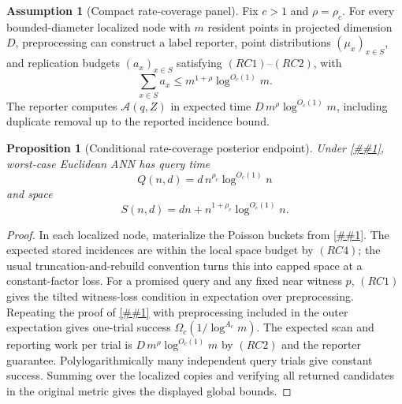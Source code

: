 \documentclass[10pt]{article}
\newcommand{\cref}[1]{\ref{##1}}
\newtheorem{proposition}[theorem]{Proposition}
\theoremstyle{definition}
\newtheorem{assumption}[theorem]{Assumption}
\begin{document}
\begin{assumption}[Compact rate-coverage panel]
   \label{asm:rate-coverage-panel}
   Fix \(c>1\) and \(\rho=\rho_c\).  For every bounded-diameter localized node
   with \(m\) resident points in projected dimension \(D\), preprocessing can
   construct a label reporter, point distributions \((\mu_x)_{x\in S}\), and
   replication budgets \((a_x)_{x\in S}\) satisfying \((RC1)\)--\((RC2)\), with
   \[
      \sum_{x\in S}a_x
      \le
      m^{1+\rho}\log^{O_c(1)}m .
      \tag{RC4}
   \]
   The reporter computes \(\mathcal A(q,Z)\) in expected time
   \(D\,m^\rho\log^{O_c(1)}m\), including duplicate removal up to the reported
   incidence bound.
\end{assumption}

\begin{proposition}[Conditional rate-coverage posterior endpoint]
   \label{prop:rate-coverage-polylog}
   Under \cref{asm:rate-coverage-panel}, worst-case Euclidean ANN has query
   time
   \[
      Q(n,d)=d\,n^{\rho_c}\log^{O_c(1)}n
   \]
   and space
   \[
      S(n,d)=dn+n^{1+\rho_c}\log^{O_c(1)}n .
   \]
\end{proposition}

\begin{proof}
   In each localized node, materialize the Poisson buckets from
   \cref{lem:poisson-rate-coverage}.  The expected stored incidences are within
   the local space budget by \((RC4)\); the usual truncation-and-rebuild
   convention turns this into capped space at a constant-factor loss.  For a
   promised query and any fixed near witness \(p\), \((RC1)\) gives the
   tilted witness-loss condition in expectation over preprocessing.  Repeating
   the proof of \cref{lem:smoothed-witness-list-compiler} with preprocessing
   included in the outer expectation gives one-trial success
   \(\Omega_c(1/\log^{A_c}m)\).  The expected scan and reporting work per trial
   is \(D\,m^\rho\log^{O_c(1)}m\) by \((RC2)\) and the reporter guarantee.
   Polylogarithmically many independent query trials give constant success.
   Summing over the localized copies and verifying all returned candidates in
   the original metric gives the displayed global bounds.
\end{proof}
\end{document}
